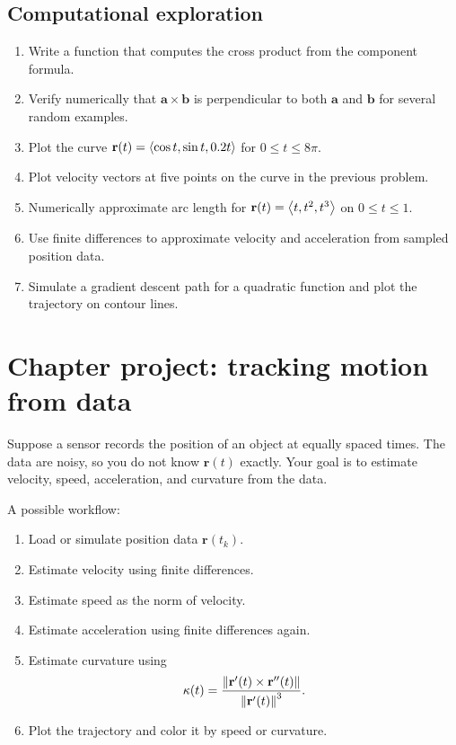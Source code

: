 \subsection*{Computational exploration}
\begin{enumerate}
\item Write a function that computes the cross product from the component formula.
\item Verify numerically that $\mathbf a\times\mathbf b$ is perpendicular to both $\mathbf a$ and $\mathbf b$ for several random examples.
\item Plot the curve $\mathbf r(t)=\left\langle \cos t,\sin t,0.2t\right\rangle$ for $0\le t\le 8\pi$.
\item Plot velocity vectors at five points on the curve in the previous problem.
\item Numerically approximate arc length for $\mathbf r(t)=\left\langle t,t^2,t^3\right\rangle$ on $0\le t\le 1$.
\item Use finite differences to approximate velocity and acceleration from sampled position data.
\item Simulate a gradient descent path for a quadratic function and plot the trajectory on contour lines.
\end{enumerate}

\section{Chapter project: tracking motion from data}

Suppose a sensor records the position of an object at equally spaced times. The data are noisy, so you do not know $\mathbf r(t)$ exactly. Your goal is to estimate velocity, speed, acceleration, and curvature from the data.

A possible workflow:
\begin{enumerate}
\item Load or simulate position data $\mathbf r(t_k)$.
\item Estimate velocity using finite differences.
\item Estimate speed as the norm of velocity.
\item Estimate acceleration using finite differences again.
\item Estimate curvature using
\[
\kappa(t)=\frac{\left\lVert \mathbf r'(t)\times\mathbf r''(t)\right\rVert}{\left\lVert \mathbf r'(t)\right\rVert^3}.
\]
\item Plot the trajectory and color it by speed or curvature.
\end{enumerate}

